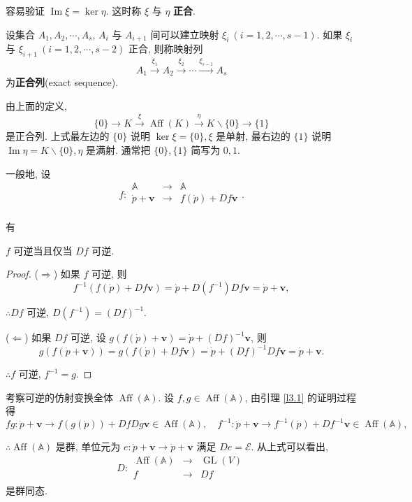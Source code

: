 \documentclass{ctexart}
\begin{document}
容易验证 $\operatorname{Im}\xi=\ker\eta$. 这时称 $\xi$ 与 $\eta$ \textbf{正合}.
\begin{definition}
    设集合 $A_1,A_2,\cdots,A_s$, $A_i$ 与 $A_{i+1}$ 间可以建立映射 $\xi_i\ (i=1,2,\cdots,s-1)$. 如果 $\xi_i$ 与 $\xi_{i+1}\ (i=1,2,\cdots,s-2)$ 正合, 则称映射列
    \[A_1\xrightarrow{\xi_1}A_2\xrightarrow{\xi_2}\cdots\xrightarrow{\xi_{s-1}}A_s\]
    为\textbf{正合列}(exact sequence).
\end{definition}
由上面的定义,
\[\{0\}\to K\xrightarrow{\xi}\operatorname{Aff}(K)\xrightarrow{\eta}K\backslash\{0\}\to\{1\}\]
是正合列. 上式最左边的 $\{0\}$ 说明 $\ker\xi=\{0\},\xi$ 是单射, 最右边的 $\{1\}$ 说明 $\operatorname{Im}\eta=K\backslash\{0\},\eta$ 是满射. 通常把 $\{0\},\{1\}$ 简写为 $0,1$.

一般地, 设
\[f:\begin{array}{rcl}
    \mathbb{A} & \to & \mathbb{A} \\
    \dot{p}+\boldsymbol{v} & \to & f(\dot{p})+Df\boldsymbol{v} \\
\end{array}.\]

有
\begin{lemma}\label{l3.1}
    $f$ 可逆当且仅当 $Df$ 可逆.
\end{lemma}
\begin{proof}
    ($\Rightarrow$) 如果 $f$ 可逆, 则
    \[f^{-1}(f(\dot{p})+Df\boldsymbol{v})=\dot{p}+D(f^{-1})Df\boldsymbol{v}=\dot{p}+\boldsymbol{v},\]

    $\therefore Df$ 可逆, $D(f^{-1})=(Df)^{-1}$.

    ($\Leftarrow$) 如果 $Df$ 可逆, 设 $g(f(\dot{p})+\boldsymbol{v})=\dot{p}+(Df)^{-1}\boldsymbol{v}$, 则
    \[g(f(\dot{p}+\boldsymbol{v}))=g(f(\dot{p})+Df\boldsymbol{v})=\dot{p}+(Df)^{-1}Df\boldsymbol{v}=\dot{p}+\boldsymbol{v}.\]

    $\therefore f$ 可逆, $f^{-1}=g$.
\end{proof}
考察可逆的仿射变换全体 $\operatorname{Aff}(\mathbb{A})$. 设 $f,g\in\operatorname{Aff}(\mathbb{A})$, 由引理 \ref{l3.1} 的证明过程得
\[fg:\dot{p}+\boldsymbol{v}\to f(g(\dot{p}))+DfDg\boldsymbol{v}\in\operatorname{Aff}(\mathbb{A}),\quad f^{-1}:\dot{p}+\boldsymbol{v}\to f^{-1}(\dot{p})+Df^{-1}\boldsymbol{v}\in\operatorname{Aff}(\mathbb{A}),\]

$\therefore\operatorname{Aff}(\mathbb{A})$ 是群, 单位元为 $e:\dot{p}+\boldsymbol{v}\to\dot{p}+\boldsymbol{v}$ 满足 $De=\mathcal{E}$. 从上式可以看出,
\[D:\begin{array}{rcl}
    \operatorname{Aff}(\mathbb{A}) & \to & \operatorname{GL}(V) \\
    f & \to & Df \\
\end{array}\]
是群同态.
\end{document}
